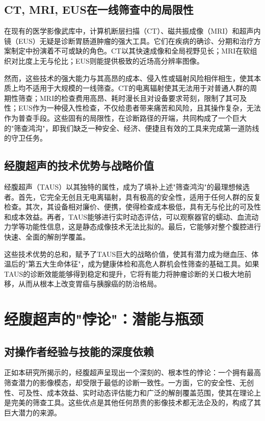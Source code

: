 \subsection{CT, MRI, EUS在一线筛查中的局限性}

在现有的医学影像武库中，计算机断层扫描（CT）、磁共振成像（MRI）和超声内镜（EUS）无疑是诊断胃肠道肿瘤的强大工具。它们在疾病的确诊、分期和治疗方案制定中扮演着不可或缺的角色。CT以其快速成像和全局视野见长；MRI在软组织对比度上无与伦比；EUS则能提供极致的近场高分辨率图像。

然而，这些技术的强大能力与其高昂的成本、侵入性或辐射风险相伴相生，使其本质上均不适用于大规模的一线筛查。CT的电离辐射使其无法用于对普通人群的周期性筛查；MRI的检查费用高昂、耗时漫长且对设备要求苛刻，限制了其可及性；EUS作为一种侵入性检查，不仅给患者带来痛苦和风险，且其操作复杂，无法作为普查手段。这些固有的局限性，在诊断路径的开端，共同构成了一个巨大的"筛查鸿沟"，即我们缺乏一种安全、经济、便捷且有效的工具来完成第一道防线的守卫任务。

\subsection{经腹超声的技术优势与战略价值}

经腹超声（TAUS）以其独特的属性，成为了填补上述"筛查鸿沟"的最理想候选者。首先，它完全无创且无电离辐射，具有极高的安全性，适用于任何人群的反复检查。其次，其设备相对廉价、便携，使得检查成本极低，具有无与伦比的可及性和成本效益。再者，TAUS能够进行实时动态评估，可以观察器官的蠕动、血流动力学等功能性信息，这是静态成像技术无法比拟的。最后，它能够对整个腹腔进行快速、全面的解剖学覆盖。

这些技术优势的总和，赋予了TAUS巨大的战略价值，使其有潜力成为继血压、体温后的"第五大生命体征"，成为健康体检和高危人群机会性筛查的基础工具。如果TAUS的诊断效能能够得到稳定和提升，它将有能力将肿瘤诊断的关口极大地前移，从而从根本上改变胃癌与胰腺癌的防治格局。

\section{经腹超声的"悖论"：潜能与瓶颈}

\subsection{对操作者经验与技能的深度依赖}

正如本研究所揭示的，经腹超声呈现出一个深刻的、根本性的悖论：一个拥有最高筛查潜力的影像模态，却受限于最低的诊断一致性。一方面，它的安全性、无创性、可及性、成本效益、实时动态评估能力和广泛的解剖覆盖范围，使其在理论上是完美的筛查工具。这些优点是其他任何昂贵的影像技术都无法企及的，构成了其巨大潜力的来源。

